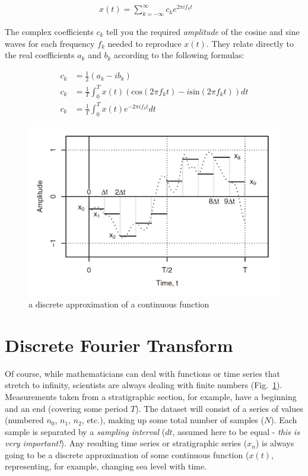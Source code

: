 \begin{align}
x(t) =  \sum_{k=-\infty}^{\infty} c_k e^{2\pi i f_k t} \qquad 
\end{align}

\noindent The complex coefficients $c_k$ tell you the required \emph{amplitude} of the cosine and sine waves for each frequency $f_k$ needed to reproduce $x(t)$. They relate directly to the real coefficients $a_k$ and $b_k$ according to the following formulas:

\begin{align}
c_k &= \frac{1}{2}(a_k - i b_k)\\
c_k &= \frac{1}{T} \int_{0}^{T}x(t) (\mathrm{cos} (2 \pi f_k t) - i \mathrm{sin} (2 \pi f_k t)) dt\\
c_k &= \frac{1}{T} \int_{0}^{T}x(t) e^{-2\pi i f_k t} dt
\end{align}

\begin{figure}[ht]
	\centering
	\includegraphics[width=1\textwidth]{figures/discrete_function.png} %
	\caption{a discrete approximation of a continuous function}
		\label{fig:discrete}
\end{figure}


\section{Discrete Fourier Transform}

Of course, while mathematicians can deal with functions or time series that stretch to infinity, scientists are always dealing with finite numbers (Fig.~\ref{fig:discrete}). Measurements taken from a stratigraphic section, for example, have a beginning and an end (covering some period $T$). The dataset will consist of a series of values (numbered $n_0$, $n_1$, $n_2$, etc.), making up some total number of samples ($N$). Each sample is separated by a \emph{sampling interval} ($dt$, assumed here to be equal - \emph{this is very important!}). Any resulting time series or stratigraphic series ($x_n$) is always going to be a discrete approximation of some continuous function ($x(t)$, representing, for example, changing sea level with time.
\\

